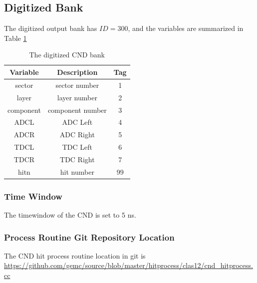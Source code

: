 \subsection{Digitized Bank}
The digitized output bank has $ID=300$, and the variables are summarized in Table \ref{tab:cndBank}

\begin{table}[h]
	\begin{center}
		\begin{tabular}{| c | c | c |}
			\hline \hline
			Variable         & Description  & Tag  \\
			\hline
              sector  &                                     sector number  &    1   \\
               layer  &                                      layer number  &    2   \\
           component  &                                  component number  &    3   \\
                ADCL  &                                          ADC Left  &    4   \\
                ADCR  &                                         ADC Right  &    5   \\
                TDCL  &                                          TDC Left  &    6   \\
                TDCR  &                                         TDC Right  &    7   \\
                hitn  &                                        hit number  &   99   \\
			\hline \hline
		\end{tabular}
	\end{center}
	\caption{The digitized CND bank}\label{tab:cndBank}
\end{table}


\subsubsection{Time Window}
The timewindow of the CND is set to 5 ns.


\subsubsection{Process Routine Git Repository Location}
The CND hit process routine location in git is \url{https://github.com/gemc/source/blob/master/hitprocess/clas12/cnd_hitprocess.cc}
